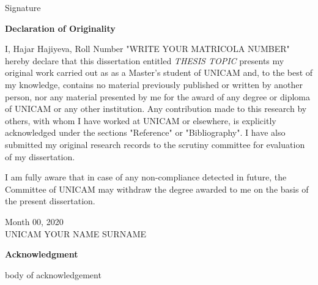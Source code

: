 \documentclass{report}
\begin{document}
\vspace*{10cm}
\begin{flushright}
\large{Signature}
\end{flushright}




\newpage
\thispagestyle{empty}
\vspace*{3cm}

\begin{center}
\Huge{\textbf{Declaration of Originality}}
\end{center}

\vspace*{0.8cm}
\Large{I, Hajar Hajiyeva, Roll Number "WRITE YOUR MATRICOLA NUMBER" hereby declare that this dissertation entitled \textit{THESIS TOPIC} presents my original work carried out as as a Master's student of  UNICAM and, to the best of my knowledge, contains no material previously published or written by another person, nor any material presented by me for the award of any degree or diploma of UNICAM or any other institution. Any contribution made to this research by others, with whom I have worked at UNICAM or elsewhere, is explicitly acknowledged under the sections "Reference" or "Bibliography". I have also submitted my original research records to the scrutiny committee for evaluation of my dissertation.

\vspace*{0.3cm}
I am fully aware that in case of any non-compliance detected in future, the Committee of UNICAM may withdraw the degree awarded to me on the basis of the present dissertation.}


\vspace*{0.5cm}
\renewcommand{\arraystretch}{0.5}
\setlength{\tabcolsep}{50pt}

\vspace*{1cm}


\Large{\noindent Month 00, 2020 \hfill \\ UNICAM \hfill  YOUR NAME SURNAME}



\newpage
\thispagestyle{empty}
\vspace*{4cm}
\begin{center}
\begin{large}
\Huge{\textbf{Acknowledgment}}
\end{large}
\end{center}
 body of acknowledgement
 
\vspace*{3cm}
\end{document}

